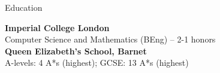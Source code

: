 \documentclass[10pt]{resume} %
\begin{document}

\begin{rSection}{Education}

{\bf Imperial College London} \hfill \\
Computer Science and Mathematics (BEng) -- 2-1 honors \\

{\bf Queen Elizabeth's School, Barnet} \\
A-levels: 4 A*s (highest); GCSE: 13 A*s (highest)

\end{rSection}

\end{document}

